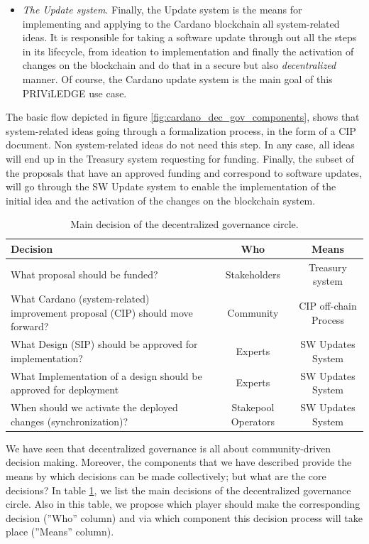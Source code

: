 \begin{itemize}
	\item \emph{The Update system}. Finally, the Update system is the means for 
	implementing and applying to the Cardano blockchain all system-related 
	ideas. It is responsible for taking a software update through out all the 
	steps in its lifecycle, from ideation to implementation and finally the 
	activation of changes on the blockchain and do that in a secure but also 
	\emph{decentralized} manner.
	Of course, the Cardano update system is the main goal of this 
	PRIViLEDGE use case.
\end{itemize}
The basic flow depicted in figure \ref{fig:cardano_dec_gov_components}, shows 
that system-related ideas going through a formalization process, in the form of 
a CIP document. Non system-related ideas do not need this step. In any case, 
all ideas 
will 
end up in the Treasury system 
requesting for funding. Finally, the subset of the proposals that have an 
approved funding and correspond to software updates, will go through the SW 
Update system to enable the implementation of the initial idea and the 
activation of the changes on the blockchain system.

\begin{table}[h!]
	\centering
	\begin{tabular}{|| p{6cm} | c | c ||} 
		\hline
		Decision & Who & Means\\ [0.5ex] 
		\hline\hline
		What proposal should be funded? & Stakeholders & Treasury system  \\ 
		\hline
		What Cardano (system-related) improvement proposal (CIP) should move 
		forward? & Community & CIP off-chain Process  \\
		\hline
		What Design (SIP) should be approved for implementation? & Experts & SW 
		Updates System  \\
		\hline
		What Implementation of a design should be approved for deployment & 
		Experts & SW Updates System  \\
		\hline
		When should we activate the deployed changes (synchronization)? & 
		Stakepool Operators & SW Updates System  \\ [1ex] 
		\hline
	\end{tabular}
	\caption{Main decision of the decentralized governance circle.}
	\label{table:main_decisions}
\end{table}

We have seen that decentralized governance is all about community-driven 
decision making. Moreover, the components that we have described provide the 
means by which decisions can be made collectively; but what are the core 
decisions? In table \ref{table:main_decisions}, we list the main decisions of 
the decentralized governance circle. Also in this table, we propose which 
player 
should make the corresponding decision (''Who'' column) and via 
which component this decision process will take place (''Means'' column).


